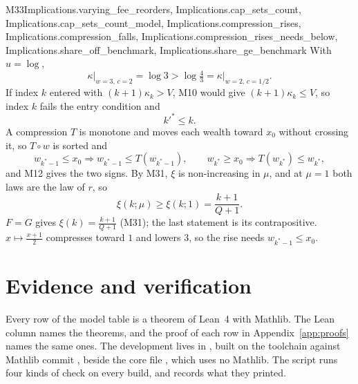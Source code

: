 \begin{mproof}{M33}{Implications.varying_fee_reorders, Implications.cap_sets_count, Implications.cap_sets_count_model, Implications.compression_rises, Implications.compression_falls, Implications.compression_rises_needs_below, Implications.share_off_benchmark, Implications.share_ge_benchmark}
With $u=\log$,
\[
  \kappa\big|_{w=3,\,c=2}=\log3>\log\tfrac43=\kappa\big|_{w=2,\,c=1/2}.
\]
If index $k$ entered with $(k+1)\kappa_k>V$, M10 would give
$(k+1)\kappa_k\le V$, so index $k$ fails the entry condition and
\[
  k'^*\le k .
\]
A compression $T$ is monotone and moves each wealth toward $x_0$ without
crossing it, so $T\circ w$ is sorted and
\[
  w_{k^*-1}\le x_0\Rightarrow w_{k^*-1}\le T(w_{k^*-1}),\qquad
  w_{k^*}\ge x_0\Rightarrow T(w_{k^*})\le w_{k^*},
\]
and M12 gives the two signs. By M31, $\xi$ is non-increasing in $\mu$, and at
$\mu=1$ both laws are the law of $r$, so
\[
  \xi(k;\mu)\ge\xi(k;1)=\frac{k+1}{Q+1}.
\]
$F=G$ gives $\xi(k)=\frac{k+1}{Q+1}$ (M31); the last statement is its
contrapositive. $x\mapsto\frac{x+1}{2}$ compresses toward $1$ and lowers $3$,
so the rise needs $w_{k^*-1}\le x_0$.
\end{mproof}




\section{Evidence and verification}
\label{app:evidence}

Every row of the model table is a theorem of Lean~4 with Mathlib. The Lean
column names the theorems, and the proof of each row in
Appendix~\ref{app:proofs} names the same ones. The development lives in
, built on the toolchain  against Mathlib
commit , beside the core file , which
uses no Mathlib. The script  runs four kinds of check on every
build, and  records what they printed.

